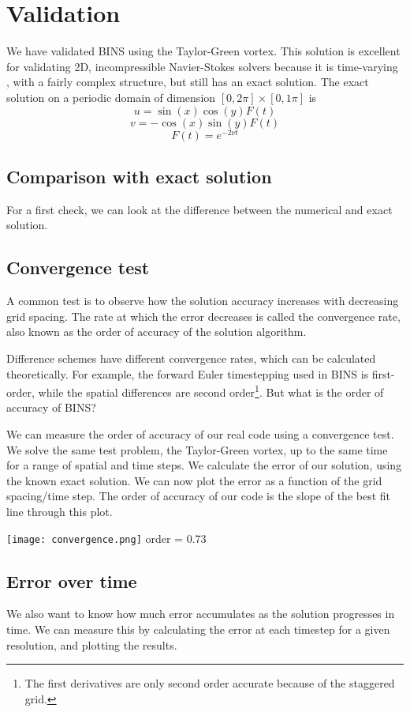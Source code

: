 \documentclass[12pt]{article}
\begin{document}
\section{Validation}
We have validated BINS using the Taylor-Green vortex.  This solution is excellent for validating 2D, incompressible Navier-Stokes solvers because it is time-varying , with a fairly complex structure, but still has an exact solution.  
The exact solution on a periodic domain of dimension $[0,2\pi] \times [0,1\pi]$ is
\[ u=\sin (x) \cos (y) F(t)\]
\[ v=-\cos (x) \sin (y) F(t)\]
\[ F(t)=e^{-2\nu t}\]

\subsection{Comparison with exact solution}
For a first check, we can look at the difference between the numerical and exact solution.

\subsection{Convergence test}
A common test is to observe how the solution accuracy increases with decreasing grid spacing.  The rate at which the error decreases is called the convergence rate, also known as the order of accuracy of the solution algorithm.  

Difference schemes have different convergence rates, which can be calculated theoretically.  For example, the forward Euler timestepping used in BINS is first-order, while the spatial differences are second order\footnote{The first derivatives are only second order accurate because of the staggered grid.}.  But what is the order of accuracy of BINS?

We can measure the order of accuracy of our real code using a convergence test.  We solve the same test problem, the Taylor-Green vortex, up to the same time for a range of spatial and time steps.  We calculate the error of our solution, using the known exact solution.  We can now plot the error as a function of the grid spacing/time step.  The order of accuracy of our code is the slope of the best fit line through this plot.

\texttt{[image: convergence.png]} 
order = 0.73

\subsection{Error over time}  
We also want to know how much error accumulates as the solution progresses in time.  We can measure this by calculating the error at each timestep for a given resolution, and plotting the results.
\end{document}

